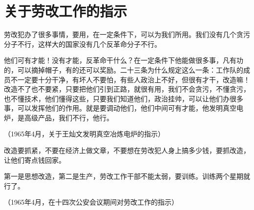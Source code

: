 \section[关于劳改工作的指示（一九六五年四月）]{关于劳改工作的指示}


劳改犯办了很多事情，要用，在一定条件下，可以为我们所用。我们没有几个贪污分子不行，这样大的国家没有几个反革命分子不行。

他们可有才能！没有才能，反革命干什么？在一定条件下他能做很多事，凡有功的，可以摘掉帽子，有的还可以奖励。二十三条为什么规定这么一条：工作队的成员不一定要十分干净，有坏人不要怕，有些人政治上不好，但很有才干，改造嘛！改造不了也不要紧，只要把他们引到正路，就很有用，我们不会贪污，不懂贪污，也不懂技术，他们懂得这些，只要我们知道他们，政治挂帅，可以让他们办很多事，可以发挥他们的作用。就是要调动他们，他们中间可有才能，他发明真空电炉，是高级产品，我们不行，他行。

{\raggedleft （1965年4月，关于王灿文发明真空冶炼电炉的指示）\par}

改造要抓紧，不要在经济上做文章，不要想在劳改犯人身上搞多少钱，要抓改造，让他们寄点钱回家。

第一是思想改造，第二是生产，劳改工作干部不能太弱，要训练。训练两个星期就行了。

{\raggedleft （1965年4月，在十四次公安会议期间对劳改工作的指示）\par}


